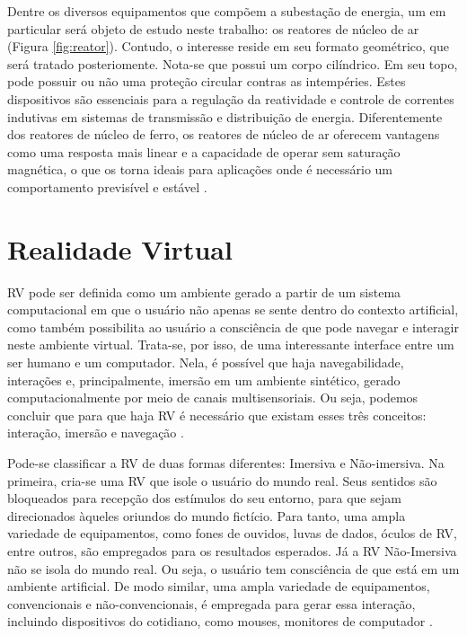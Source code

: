 Dentre os diversos equipamentos que compõem a subestação de energia, um em particular será objeto de estudo neste trabalho: os reatores de núcleo de ar (Figura \ref{fig:reator}). Contudo, o interesse reside em seu formato geométrico, que será tratado posteriomente. Nota-se que possui um corpo cilíndrico. Em seu topo, pode possuir ou não uma proteção circular contras as intempéries. Estes dispositivos são essenciais para a regulação da reatividade e controle de correntes indutivas em sistemas de transmissão e distribuição de energia. Diferentemente dos reatores de núcleo de ferro, os reatores de núcleo de ar oferecem vantagens como uma resposta mais linear e a capacidade de operar sem saturação magnética, o que os torna ideais para aplicações onde é necessário um comportamento previsível e estável \cite{de2012reatores}. 

\section{Realidade Virtual}
\label{sec:precisaorecall}

RV pode ser definida como um ambiente gerado a partir de um sistema computacional em que o usuário não apenas se sente dentro do contexto artificial, como também possibilita ao usuário a consciência de que pode navegar e interagir neste ambiente virtual. Trata-se, por isso, de uma interessante interface entre um ser humano e um computador. Nela, é possível que haja navegabilidade, interações e, principalmente, imersão em um ambiente sintético, gerado computacionalmente por meio de canais multisensoriais. Ou seja, podemos concluir que para que haja RV é necessário que existam esses três conceitos: interação, imersão e navegação \cite{kalawsky1993science}.

Pode-se classificar a RV de duas formas diferentes: Imersiva e Não-imersiva. Na primeira, cria-se uma RV que isole o usuário do mundo real. Seus sentidos são bloqueados para recepção dos estímulos do seu entorno, para que sejam direcionados àqueles oriundos do mundo fictício. Para tanto, uma ampla variedade de equipamentos, como fones de ouvidos, luvas de dados, óculos de RV, entre outros, são empregados para os resultados esperados. Já a RV Não-Imersiva não se isola do mundo real. Ou seja, o usuário tem consciência de que está em um ambiente artificial. De modo similar, uma ampla variedade de equipamentos, convencionais e não-convencionais, é empregada para gerar essa interação, incluindo dispositivos do cotidiano, como mouses, monitores de computador \cite {cardoso2007tecnologias}.

